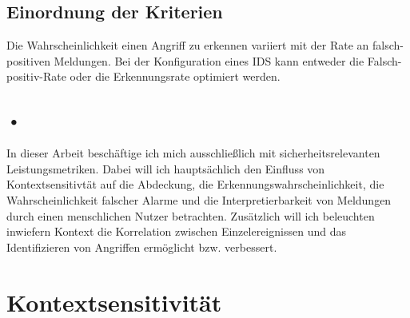 
\subsection{Einordnung der Kriterien}
Die Wahrscheinlichkeit einen Angriff zu erkennen variiert mit der Rate an falsch-positiven Meldungen. Bei der Konfiguration eines IDS kann entweder die Falsch-positiv-Rate oder die Erkennungsrate optimiert werden.

\subsection{•}
\cite{milenkoski_evaluating_2015}
In dieser Arbeit beschäftige ich mich ausschließlich mit sicherheitsrelevanten Leistungsmetriken. Dabei will ich hauptsächlich den Einfluss von Kontextsensitivtät auf die Abdeckung, die Erkennungswahrscheinlichkeit, die Wahrscheinlichkeit  falscher Alarme und die Interpretierbarkeit von Meldungen durch einen menschlichen Nutzer betrachten. Zusätzlich will ich beleuchten inwiefern Kontext die Korrelation zwischen Einzelereignissen und das Identifizieren von Angriffen ermöglicht bzw. verbessert.
\section{Kontextsensitivität}
